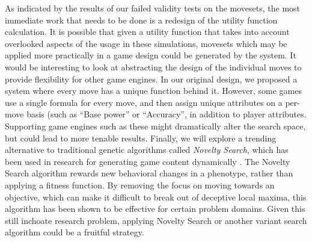 \documentclass{acm_proc_article-sp}
\begin{document}
As indicated by the results of our failed validity tests on the movesets, the most immediate work that needs to be done is a redesign of the utility function calculation. It is possible that given a utility function that takes into account overlooked aspects of the usage in these simulations, movesets which may be applied more practically in a game design could be generated by the system.
	It would be interesting to look at abstracting the design of the individual moves to provide flexibility for other game engines. In our original design, we proposed a system where every move has a unique function behind it. However, some games use a single formula for every move, and then assign unique attributes on a per-move basis (such as “Base power” or “Accuracy”, in addition to player attributes. Supporting game engines such as these might dramatically alter the search space, but could lead to more tenable results.
	Finally, we will explore a trending alternative to traditional genetic algorithms called \textit{Novelty Search}, which has been used in research for generating game content dynamically \cite {novelty_search}. The Novelty Search algorithm rewards new behavioral changes in a phenotype, rather than applying a fitness function. By removing the focus on moving towards an objective, which can make it difficult to break out of deceptive local maxima, this algorithm has been shown to be effective for certain problem domains. Given this still inchoate research problem, applying Novelty Search or another variant search algorithm could be a fruitful strategy.
    
    


%






\balancecolumns
\end{document}
